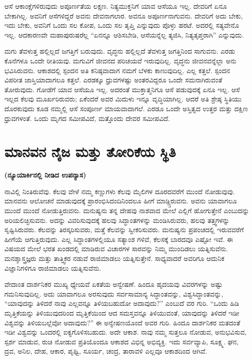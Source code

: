 ಆಸೆ ಆಕಾಂಕ್ಷೆಗಳಿರುವುದು ಅಪೂರ್ಣತೆಯ ಲಕ್ಷಣ. ನಿತ್ಯಮುಕ್ತನಿಗೆ ಯಾವ ಆಸೆಯೂ ಇಲ್ಲ. ದೇವರಿಗೆ ಏನೂ ಬೇಕಾಗಿಲ್ಲ. ಅವನಿಗೆ ಆಸೆಗಳಿದ್ದರೆ ಅವನು ದೇವನಾಗಲಾರ. ಅವನೂ ಅಪೂರ್ಣನಾಗುವನು. ದೇವರಿಗೆ ಅದು ಬೇಕು, ಇದು ಬೇಕು, ಅವನಿಗೆ ಒಂದು ಸಲ ಕೋಪ, ಒಂದು ಸಲ ತೃಪ್ತಿ ಎನ್ನುವುದು ಪೊಳ್ಳು ಹರಟೆ. ಅದರಲ್ಲಿ ಸತ್ಯವೇನೊ ಇಲ್ಲ. ಆದಕಾರಣವೇ ಮಹಾಪುರುಷರೆಲ್ಲ “ಏನನ್ನೂ ಆಶಿಸಬೇಡಿ, ಆಸೆಯನ್ನೆಲ್ಲ ತ್ಯಜಿಸಿ, ನಿತ್ಯತೃಪ್ತರಾಗಿ” ಎನ್ನುವುದು.

ಮಗು ತೆವಳುತ್ತ ಹಲ್ಲಿಲ್ಲದೆ ಜಗತ್ತಿಗೆ ಬರುವುದು. ವೃದ್ಧನು ಹಲ್ಲಿಲ್ಲದೆ ತೆವಳುತ್ತ ಜಗತ್ತಿನಿಂದ ಸಾಗುವನು. ಎರಡು ಕೊನೆಗಳೂ ಒಂದೇ ರೀತಿಯವು. ಮಗುವಿಗೆ ಜೀವನದ ಪರಿಚಯವೆ ಇರುವುದಿಲ್ಲ. ವೃದ್ಧನು ಜೀವನವನ್ನೆಲ್ಲಾ ಅನು ಭವಿಸಿರುವನು. ಆಕಾಶದಲ್ಲಿ ಸ್ಪಂದನ ಅತಿ ಕನಿಷ್ಠವಾದಾಗ ನಮಗೆ ಬೆಳಕು ಕಾಣುವುದಿಲ್ಲ. ಎಲ್ಲ ಕತ್ತಲೆ. ಸ್ಪಂದನ ವಿಪರೀತ ಜಾಸ್ತಿಯಾದಾಗಲೂ ಕತ್ತಲೆ. ಎರಡಕ್ಕೂ ಧ್ರುವಗಳಷ್ಟು ಅಂತರವಿದ್ದರೂ ಒಂದೇ ಸಮನಾಗಿರುವಂತೆ ತೋರುವುದು. ಗೋಡೆಗೆ ಯಾವ ಆಸೆಯೂ ಇಲ್ಲ. ಅದರಂತೆ ಮುಕ್ತಾತ್ಮನಿಗೂ ಆಸೆ ಪಡುವುದಕ್ಕೆ ಏನೂ ಇಲ್ಲ. ಆಸೆ ಇಲ್ಲದ ಕೆಲವು ಮೂರ್ಖರಿರುವರು; ಏಕೆಂದರೆ ಅವರ ಮಿದುಳು ಇನ್ನೂ ವೃದ್ಧಿಯಾಗಿಲ್ಲ. ಆದರೆ ಅತಿ ಶ್ರೇಷ್ಠ ಸ್ಥಿತಿಯು ದೊರಕುವುದು ಕೂಡ ನಮ್ಮಲ್ಲಿ ಆಸೆ ಸಂಪೂರ್ಣ ಮಾಯವಾದಾಗಲೆ. ಎರಡೂ ಒಂದೇ ಅಸ್ತಿತ್ವದ ಉತ್ತರ ಮತ್ತು ದಕ್ಷಿಣ ಧ್ರುವಗಳಂತೆ. ಒಂದು ಮೃಗದ ಸಮೀಪವಿದೆ, ಮತ್ತೊಂದು ದೇವರ ಸಮೀಪವಿದೆ.

\chapter{ಮಾನವನ ನೈಜ ಮತ್ತು ತೋರಿಕೆಯ ಸ್ಥಿತಿ}

\centerline{\textbf{(ನ್ಯೂಯಾರ್ಕಿನಲ್ಲಿ ನೀಡಿದ ಉಪನ್ಯಾಸ)}}

ನಾವಿಲ್ಲಿ ನಿಂತಿರುವೆವು. ಕೆಲವು ವೇಳೆ ನಮ್ಮ ಕಣ್ಣುಗಳು ಕೆಲವು ಮೈಲಿಗಳ ದೂರದವರೆಗೆ ಮುಂದೆ ನೋಡುವುವು. ಮಾನವನು ಆಲೋಚನೆ ಮಾಡುವುದಕ್ಕೆ ಪ್ರಾರಂಭಿಸಿದಂದಿನಿಂದಲೂ ಹೀಗೆ ಮಾಡ್ಡ್ತಿರುವನು. ಅವನು ಯಾವಾಗಲೂ ಮುಂದೆ ಮುಂದೆ ನೋಡುತ್ತಿರುವನು. ಮನುಷ್ಯನು ತನ್ನ ದೇಹವು ನಾಶವಾದ ಮೇಲೆ ಎಲ್ಲಿಗೆ ಹೋಗುತ್ತೇನೆ ಎಂಬುದನ್ನು ಅರಿಯಲಿಚ್ಛಿಸುವನು. ಅದನ್ನು ವಿವರಿಸುವುದಕ್ಕೆ ಹಲವು ಸಿದ್ಧಾಂತಗಳನ್ನು ಮಂಡಿಸಿರುವರು, ಹಲವು ತತ್ತ್ವಗಳನ್ನು ಸೃಷ್ಟಿಸಿರುವರು. ಕೆಲವನ್ನು ತಿರಸ್ಕರಿಸುವರು, ಮತ್ತೆ ಕೆಲವನ್ನು ಸ್ವೀಕರಿಸುವರು. ಮನುಷ್ಯನು ಪ್ರಪಂಚದಲ್ಲಿ ಇರುವವರೆಗೆ ಹೀಗೆಯೆ ಆಗುತ್ತಿರುವುದು. ಎಲ್ಲ ಸಿದ್ಧಾಂತಗಳಲ್ಲಿಯೂ ಸತ್ಯಾಂಶ ಗಳಿವೆ, ಕೆಲಸಕ್ಕೆ ಬಾರದವೂ ಎಷ್ಟೋ ಇವೆ. ಈ ವಿಷಯದ ಮೇಲೆ ಭರತ ಖಂಡದಲ್ಲಿ ಮಾಡಿರುವ ವಿಚಾರಗಳ ಸಾರವನ್ನು ನಿಮ್ಮ ಮುಂದಿಡಲು ಯತ್ನಿಸುವೆನು. ಮನಶ್ಶಾಸ್ತ್ರಜ್ಞರು ಮತ್ತು ತಾತ್ತ್ವಿಕರ ನಡುವೆ ರಾಜಿಮಾಡಲು ಯತ್ನಿಸುತ್ತೇನೆ. ಸಾಧ್ಯವಾದರೆ ಅವರಿಗೂ ಆದುನಿಕ ವಿಜ್ಞಾನಿಗಳಿಗೂ ರಾಜಿಮಾಡಲು ಯತ್ನಿಸುವೆನು.

ವೇದಾಂತ ದಾರ್ಶನಿಕರ ಮುಖ್ಯ ಧ್ಯೇಯವೆ ಏಕತೆಯ ಅನ್ವೇಷಣೆ. ಹಿಂದೂ ಹೃದಯವು ವಿವರಗಳನ್ನು ಅಷ್ಟು ಗಮನಿಸುವುದಿಲ್ಲ. ಅದು ಯಾವಾಗಲೂ ಅರಸುವುದು ಸರ್ವಸಾಮಾನ್ಯ ಸಿದ್ಧಾಂತವನ್ನು, ವಿಶ್ವಸಿದ್ಧಾಂತವನ್ನು, “ಯಾವುದನ್ನು ತಿಳಿದರೆ ನಾವು ಎಲ್ಲವನ್ನೂ ತಿಳಿಯಬಹುದೋ ಅದಾವುದು?” ಎಂಬುದೆ ವರ ಗುರಿ. “ಒಂದು ಹಿಡಿ ಮೃತ್ತಿಕೆಯನ್ನು ತಿಳಿಯುವುದರಿಂದ ಮೃತ್ತಿಕೆಯಿಂದ ಆದ ಸಮಸ್ತವನ್ನೂ ತಿಳಿಯುವಂತೆ, ಯಾವುದನ್ನು ತಿಳಿದರೆ ಇಡೀ ವಿಶ್ವವನ್ನು ತಿಳಿಯಬಲ್ಲೆವೋ ಅದಾವುದು?” ಈ ಅನ್ವೇಷಣಯೊಂದೆ ಅವರ ಗುರಿ. ಹಿಂದೂ ದಾರ್ಶನಿಕರ ಮತದಂತೆ ಇಡೀ ವಿಶ್ವವನ್ನು ಒಂದರಲ್ಲಿ ಐಕ್ಯಗೊಳಿಸಬಹುದು. ಅದೇ ಆಕಾಶ. ನಾವು ನಮ್ಮ ಸುತ್ತಲೂ ನೋಡುವ, ಅನುಭವಿಸುವ, ಸ್ಪರ್ಶ ಮಾಡುವ, ರುಚಿ ನೋಡುವ ಪ್ರತಿಯೊಂದೂ ಆಕಾಶದ ವಿಭಿನ್ನ ಅಭಿವ್ಯಕ್ತಿ. ಇದು ಸರ್ವವ್ಯಾಪಿ, ಸೂಕ್ಷ್ಮ. ಘನ, ದ್ರವ, ಅನಿಲ, ದೇಹ, ಆಕಾರ, ಪೃಥ್ವಿ, ಸೂರ್ಯ, ಚಂದ್ರ, ತಾರಾವಳಿ ಎಲ್ಲವೂ ಆಕಾಶದಿಂದ ಆಗಿವೆ.

